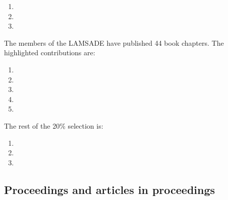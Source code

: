 \documentclass[version=last, pagesize, twoside=semi, DIV=calc, 12pt, a4paper, french, english, bibliography=totoc]{scrartcl}
\begin{document}
\begin{enumerate}
\item {}
\item {}
\item {}
\end{enumerate}











The members of the LAMSADE have published 
44 book chapters. The highlighted contributions are:
\begin{enumerate}
\item {}
\item {}
\item {}
\item {}
\item {}
\end{enumerate}
The rest of the 20\% selection is:
\begin{enumerate}
\item {}
\item {}
\item {}
\end{enumerate}





\subsection{Proceedings and articles in proceedings}
\end{document}
